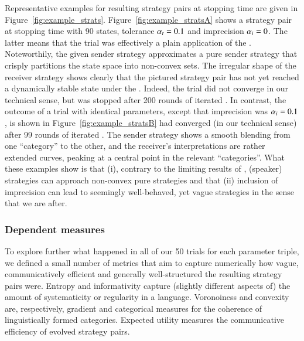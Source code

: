 Representative examples for resulting strategy pairs at stopping time
are given in
Figure~\ref{fig:example_strats}. Figure~\ref{fig:example_stratsA}
shows a strategy pair at stopping time with 90 states, tolerance
$\alpha_t = 0.1$ and imprecision $\alpha_i = 0$. The latter means
that the trial was effectively a plain application of the
\rd. Noteworthily, the given sender strategy approximates a pure
sender strategy that crisply partitions the state space into
non-convex sets. The irregular shape of the receiver strategy shows
clearly that the pictured strategy pair has not yet reached a
dynamically stable state under the \rd. Indeed, the trial did not
converge in our technical sense, but was stopped after 200 rounds of
iterated \rdd. In contrast, the outcome of a trial with identical
parameters, except that imprecision was $\alpha_i = 0.1$, is shown
in Figure~\ref{fig:example_stratsB} had converged (in our technical
sense) after 99 rounds of iterated \rdd. The sender strategy shows a
smooth blending from one ``category'' to the other, and the receiver's
interpretations are rather extended curves, peaking at a central point
in the relevant ``categories''. What these examples show is that (i),
contrary to the limiting results of
\citet{Jager2007:The-Evolution-o,JagerMetzger2011:Voronoi-Languag},
(speaker) strategies can approach non-convex pure strategies and that
(ii) inclusion of imprecision can lead to seemingly well-behaved, yet
vague strategies in the sense that we are after.

\subsubsection{Dependent measures}
 
To explore further what happened in all of our 50 trials for each
parameter triple, we defined a small number of metrics that aim to
capture numerically how vague, communicatively efficient and generally
well-structured the resulting strategy pairs were. Entropy and
informativity capture (slightly different aspects of) the amount of
systematicity or regularity in a language. Voronoiness and convexity
are, respectively, gradient and categorical measures for the coherence
of linguistically formed categories. Expected utility measures the
communicative efficiency of evolved strategy pairs. 


